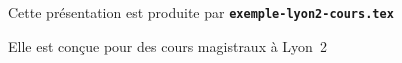   \item Cette présentation est produite par \texttt{\textbf{exemple-lyon2-cours.tex}}
  \item Elle est conçue pour des cours magistraux à Lyon~2
